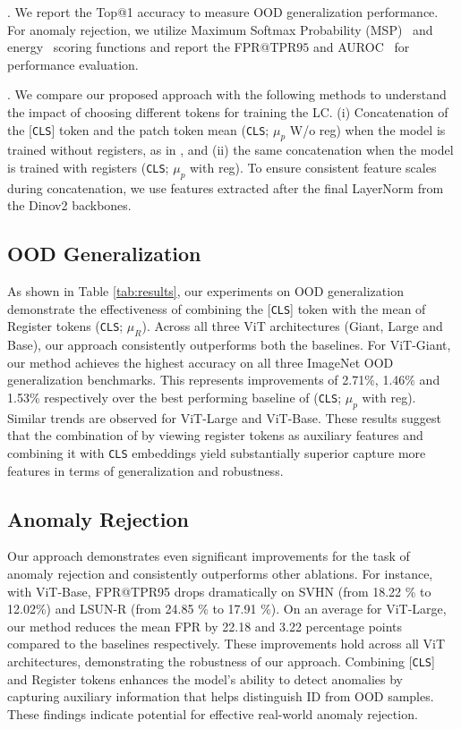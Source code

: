 \documentclass[conference]{IEEEtran}
\begin{document}
. We report the Top@1 accuracy to measure OOD generalization performance. For anomaly rejection, we utilize Maximum Softmax Probability (MSP)~\cite{hendrycks2017a} and energy~\cite{energyood} scoring functions and report the FPR@TPR$95$ and AUROC~\cite{energyood} for performance evaluation.  

. We compare our proposed approach with the following methods to understand the impact of choosing different tokens for training the LC. (i) Concatenation of the [\texttt{CLS}] token and the patch token mean (\texttt{CLS}; $\mu_p$ W/o reg) when the model is trained without registers, as in \cite{oquab2023dinov2}, and (ii) the same concatenation when the model is trained with registers (\texttt{CLS}; $\mu_p$ with reg). To ensure consistent feature scales during concatenation, we use features extracted after the final LayerNorm from the Dinov2 backbones.

\subsection{OOD Generalization}
As shown in Table \ref{tab:results}, our experiments on OOD generalization demonstrate the effectiveness of combining the [\texttt{CLS}] token with the mean of Register tokens (\texttt{CLS}; $\mu_R$). Across all three ViT architectures (Giant, Large and Base), our approach consistently outperforms both the baselines. For ViT-Giant, our method achieves the highest accuracy on all three ImageNet OOD generalization benchmarks. This represents improvements of 2.71\%, 1.46\% and 1.53\% respectively over the best performing baseline of (\texttt{CLS}; $\mu_p$ with reg). Similar trends are observed for ViT-Large and ViT-Base. These results suggest that the combination of by viewing register tokens as auxiliary features and combining it with \texttt{CLS} embeddings yield substantially superior capture more features in terms of generalization and robustness. 
\subsection{Anomaly Rejection}
Our approach demonstrates even significant improvements for the task of anomaly rejection and consistently outperforms other ablations. For instance, with ViT-Base, FPR@TPR95 drops dramatically on SVHN (from 18.22 \% to 12.02\%) and LSUN-R (from 24.85 \% to 17.91 \%). On an average for ViT-Large, our method reduces the mean FPR by 22.18 and 3.22  percentage points compared to the baselines respectively. These improvements hold across all ViT architectures, demonstrating the robustness of our approach. Combining [\texttt{CLS}] and Register tokens enhances the model's ability to detect anomalies by capturing auxiliary information that helps distinguish ID from OOD samples. These findings indicate potential for effective real-world anomaly rejection.
\end{document}
